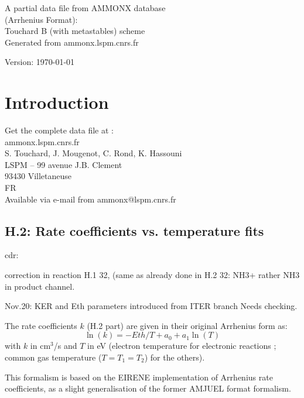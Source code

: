 \documentclass[12pt]{article}
\begin{document}
\parindent 0pt
{\Large \bf \center
\vspace*{3truecm}

A partial data file from AMMONX database \\(Arrhenius Format):\\
Touchard B (with metastables) scheme\\Generated from ammonx.lspm.cnrs.fr
\vspace*{3truecm}

Version: \today

}
\newpage
\tableofcontents
\newpage
\section*{Introduction}

Get the complete data file at :\\
ammonx.lspm.cnrs.fr\\
S. Touchard, J. Mougenot, C. Rond, K. Hassouni\\
LSPM -- 99 avenue J.B. Clement\\
93430 Villetaneuse \\
FR\\
Available via e-mail from ammonx@lspm.cnrs.fr

\subsection*{H.2: Rate coefficients vs. temperature fits}
cdr:  

correction in reaction H.1 32, (same as already done in
      H.2  32:  NH3+ rather NH3 in product channel.

Nov.20:  KER and Eth parameters introduced from ITER branch
         Needs checking.

The rate coefficients $k$ (H.2 part) are given in their
original Arrhenius form as:
\begin{equation}
\ln(k) = -Eth/T + a_0 +  a_1 \ln(T)
\end{equation}
with $k$ in cm$^3$/s and $T$ in eV (electron temperature for electronic reactions ; 
common gas temperature ($T= T_1 = T_2$) for the others).

This formalism is based on the EIRENE implementation
of Arrhenius rate coefficients, as a slight generalisation
of the former AMJUEL format formalism.
\end{document}
